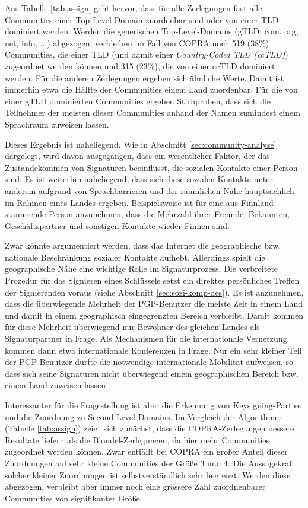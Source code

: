 Aus Tabelle \ref{tab:assign} geht hervor, dass für alle Zerlegungen
fast alle Communities einer Top-Level-Domain zuordenbar sind oder von
einer TLD dominiert werden. Werden die generischen Top-Level-Domains
(gTLD: com, org, net, info, ...) abgezogen, verbleiben im Fall von COPRA
noch 519 (38\%) Communities, die einer TLD (und damit einer
\emph{Country-Coded TLD (ccTLD)}) zugeordnet werden können und 315
(23\%), die von einer ccTLD dominiert werden. Für die anderen
Zerlegungen ergeben sich ähnliche Werte. Damit ist immerhin etwa die
Hälfte der Communities einem Land zuordenbar. Für die von einer
gTLD dominierten Communities ergeben Stichproben, dass sich die
Teilnehmer der meisten dieser Communities anhand der Namen zumindest
einem Sprachraum zuweisen lassen.

Dieses Ergebnis ist naheliegend. Wie in Abschnitt
\ref{sec:community-analyse} dargelegt, wird davon ausgegangen, dass
ein wesentlicher Faktor, der das Zustandekommen von Signaturen
beeinflusst, die sozialen Kontakte einer Person sind. Es ist weiterhin
naheliegend, dass sich diese sozialen Kontakte unter anderem aufgrund
von Sprachbarrieren und der räumlichen Nähe hauptsächlich im
Rahmen eines Landes ergeben. Beispielsweise ist für eine aus
Finnland stammende Person anzunehmen, dass die Mehrzahl ihrer Freunde,
Bekannten, Geschäftspartner und sonstigen Kontakte wieder Finnen
sind.

Zwar könnte argumentiert werden, dass das Internet die geographische
bzw. nationale Beschränkung sozialer Kontakte aufhebt. Allerdings
spielt die geographische Nähe eine wichtige Rolle im
Signaturprozess. Die verbreitete Prozedur für das Signieren eines
Schlüssels setzt ein direktes persönliches Treffen der
Signierenden voraus (siehe Abschnitt \ref{sec:sozi-komp-des}). Es ist
anzunehmen, dass die überwiegende Mehrheit der PGP-Benutzer die
meiste Zeit in einem Land und damit in einem geographisch
eingegrenzten Bereich verbleibt. Damit kommen für diese Mehrheit
überwiegend nur Bewohner des gleichen Landes als Signaturpartner in
Frage. Als Mechanismen für die internationale Vernetzung kommen dann
etwa internationale Konferenzen in Frage. Nur ein sehr kleiner Teil
der PGP-Benutzer dürfte die notwendige internationale Mobilität
aufweisen, so dass sich seine Signaturen nicht überwiegend einem
geographischen Bereich bzw. einem Land zuweisen lassen.

Interessanter für die Fragestellung ist aber die Erkennung von
Keysigning-Parties und die Zuordnung zu Second-Level-Domains. Im
Vergleich der Algorithmen (Tabelle \ref{tab:assign}) zeigt sich
zunächst, dass die COPRA-Zerlegungen bessere Resultate liefern als
die Blondel-Zerlegungen, da hier mehr Communities zugeordnet werden
können. Zwar entfällt bei COPRA ein großer Anteil dieser
Zuordnungen auf sehr kleine Communities der Größe 3 und 4. Die
Aussagekraft solcher kleiner Zuordnungen ist selbstverständlich sehr
begrenzt. Werden diese abgezogen, verbleibt aber immer noch eine
grössere Zahl zuordnenbarer Communities von signifikanter Größe. 

